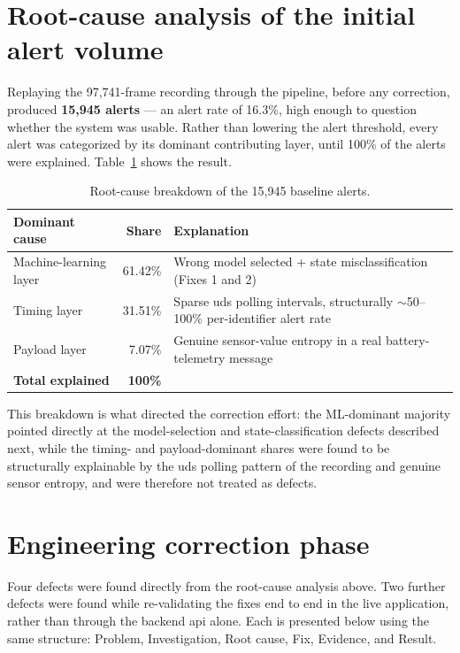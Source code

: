 \section{Root-cause analysis of the initial alert volume}
\label{sec:validation-rootcause}

Replaying the 97{,}741-frame recording through the pipeline, before any correction, produced \textbf{15{,}945 alerts} — an alert rate of 16.3\%, high enough to question whether the system was usable. Rather than lowering the alert threshold, every alert was categorized by its dominant contributing layer, until 100\% of the alerts were explained. Table~\ref{tab:rootcause} shows the result.

\begin{table}[H]
\centering
\caption{Root-cause breakdown of the 15,945 baseline alerts.}
\label{tab:rootcause}
\begin{tabular}{|p{3.4cm}|r|p{7.5cm}|}
\hline
\textbf{Dominant cause} & \textbf{Share} & \textbf{Explanation} \\
\hline
Machine-learning layer & 61.42\% & Wrong model selected + state misclassification (Fixes 1 and 2) \\
\hline
Timing layer            & 31.51\% & Sparse \gls{uds} polling intervals, structurally $\sim$50--100\% per-identifier alert rate \\
\hline
Payload layer            & 7.07\%  & Genuine sensor-value entropy in a real battery-telemetry message \\
\hline
\textbf{Total explained} & \textbf{100\%} & \\
\hline
\end{tabular}
\end{table}

This breakdown is what directed the correction effort: the ML-dominant majority pointed directly at the model-selection and state-classification defects described next, while the timing- and payload-dominant shares were found to be structurally explainable by the \gls{uds} polling pattern of the recording and genuine sensor entropy, and were therefore not treated as defects.

\section{Engineering correction phase}

Four defects were found directly from the root-cause analysis above. Two further defects were found while re-validating the fixes end to end in the live application, rather than through the backend \gls{api} alone. Each is presented below using the same structure: Problem, Investigation, Root cause, Fix, Evidence, and Result.

